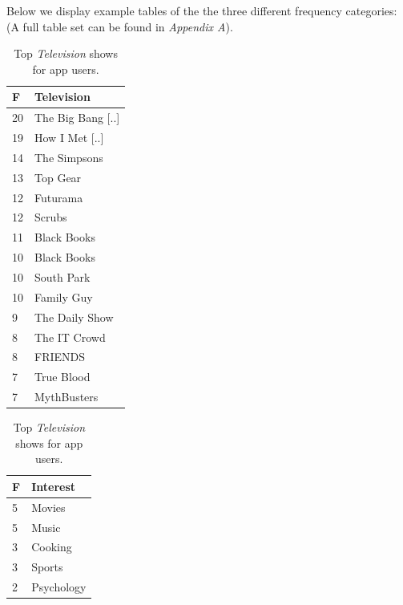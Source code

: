 Below we display example tables of the the three different frequency categories: (A full table set can be found in \emph{Appendix A}).
\begin{table}[h]
\begin{minipage}[b]{.30\textwidth}
\centering
  \begin{tabular}{|l|l|} %
  \hline
  	\small{\textbf{F}} & \small{\textbf{Television}} \\ \hline
		\small{20} & \small{The Big Bang [..]} \\ \hline
		\small{19} & \small{How I Met [..]} \\ \hline
		\small{14} & \small{The Simpsons} \\ \hline
		\small{13} & \small{Top Gear} \\ \hline
		\small{12} & \small{Futurama} \\ \hline
		\small{12} & \small{Scrubs} \\ \hline
		\small{11} & \small{Black Books} \\ \hline
		\small{10} & \small{Black Books} \\ \hline
		\small{10} & \small{South Park} \\ \hline
		\small{10} & \small{Family Guy} \\ \hline
		\small{9} & \small{The Daily Show} \\ \hline
		\small{8} & \small{The IT Crowd} \\ \hline
		\small{8} & \small{FRIENDS} \\ \hline
		\small{7} & \small{True Blood} \\ \hline
		\small{7} & \small{MythBusters} \\ \hline
  \end{tabular}
  \caption{Top \emph{Television} shows for app users.}
\end{minipage}
\begin{minipage}[b]{.30\textwidth}
\centering
  \begin{tabular}{|l|l|} %
  \hline
  	\small{\textbf{F}} & \small{\textbf{Interest}} \\ \hline
		\small{5} & \small{Movies} \\ \hline
		\small{5} & \small{Music} \\ \hline
		\small{3} & \small{Cooking} \\ \hline
		\small{3} & \small{Sports} \\ \hline
		\small{2} & \small{Psychology} \\ \hline

\end{tabular}
\end{minipage}
\end{table}
